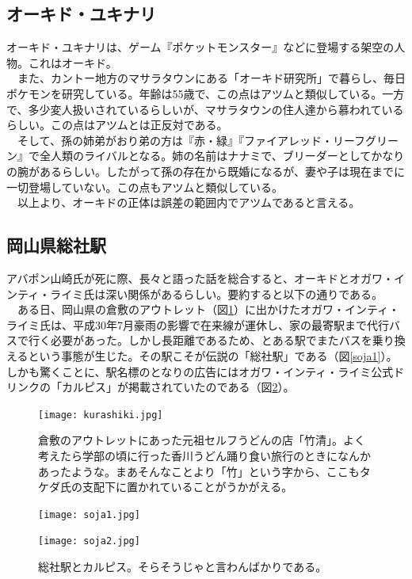 \subsection{オーキド・ユキナリ}
オーキド・ユキナリは、ゲーム『ポケットモンスター』などに登場する架空の人物。これはオーキド。\\
　また、カントー地方のマサラタウンにある「オーキド研究所」で暮らし、毎日ポケモンを研究している。年齢は55歳で、この点はアツムと類似している。一方で、多少変人扱いされているらしいが、マサラタウンの住人達から慕われているらしい。この点はアツムとは正反対である。\\
　そして、孫の姉弟がおり弟の方は『赤・緑』『ファイアレッド・リーフグリーン』で全人類のライバルとなる。姉の名前はナナミで、ブリーダーとしてかなりの腕があるらしい。したがって孫の存在から既婚になるが、妻や子は現在までに一切登場していない。この点もアツムと類似している。\\
　以上より、オーキドの正体は誤差の範囲内でアツムであると言える。

\subsection{岡山県総社駅}
アバポン山崎氏が死に際、長々と語った話を総合すると、オーキドとオガワ・インティ・ライミ氏は深い関係があるらしい。要約すると以下の通りである。\\
　ある日、岡山県の倉敷のアウトレット（図\ref{kurashiki}）に出かけたオガワ・インティ・ライミ氏は、平成30年7月豪雨の影響で在来線が運休し、家の最寄駅まで代行バスで行く必要があった。しかし長距離であるため、とある駅でまたバスを乗り換えるという事態が生じた。その駅こそが伝説の「総社駅」である（図\ref{soja1}）。しかも驚くことに、駅名標のとなりの広告にはオガワ・インティ・ライミ公式ドリンクの「カルピス」が掲載されていたのである（図\ref{soja2}）。

\begin{figure}[H]
\centering
\texttt{[image: kurashiki.jpg]}
\caption{倉敷のアウトレットにあった元祖セルフうどんの店「竹清」。よく考えたら学部の頃に行った香川うどん踊り食い旅行のときになんかあったような。まあそんなことより「竹」という字から、ここもタケダ氏の支配下に置かれていることがうかがえる。}
\label{kurashiki}
\end{figure}


\begin{figure}[htbp]
 \begin{minipage}{0.4\hsize}
  \begin{center}
\texttt{[image: soja1.jpg]}
  \end{center}
  \label{soja1}
 \end{minipage}
 \begin{minipage}{0.4\hsize}
  \begin{center}
\texttt{[image: soja2.jpg]}
  \end{center}
 \end{minipage}
 \caption{総社駅とカルピス。そらそうじゃと言わんばかりである。}
  \label{soja2}
\end{figure}

